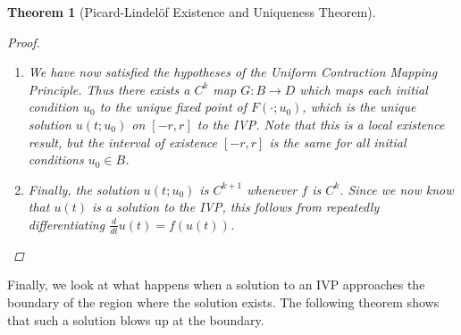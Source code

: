 \documentclass[12pt]{amsart}         %
\newtheorem{theorem}{Theorem}[section]
\theoremstyle{remark}
\begin{document}
\begin{theorem}[Picard-Lindel\"{o}f Existence and Uniqueness Theorem]
\begin{proof}
\begin{enumerate}
\item We have now satisfied the hypotheses of the Uniform Contraction Mapping Principle. Thus there exists a $C^k$ map $G: B \rightarrow D$ which maps each initial condition $u_0$ to the unique fixed point of $F(\cdot; u_0)$, which is the unique solution $u(t; u_0)$ on $[-r, r]$ to the IVP. Note that this is a local existence result, but the interval of existence $[-r, r]$ is the same for all initial conditions $u_0 \in B$.

\item Finally, the solution $u(t; u_0)$ is $C^{k+1}$ whenever $f$ is $C^k$. Since we now know that $u(t)$ is a solution to the IVP, this follows from repeatedly differentiating $\frac{d}{dt}u(t) = f(u(t))$.

\end{enumerate}
\end{proof}
\end{theorem}

Finally, we look at what happens when a solution to an IVP approaches the boundary of the region where the solution exists. The following theorem shows that such a solution blows up at the boundary.
\end{document}
